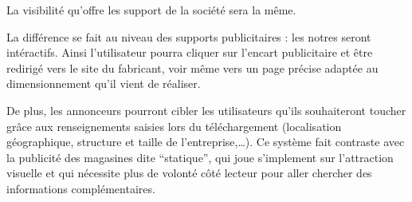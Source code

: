 	La visibilité qu'offre les support de la société \K{} sera la même.

	La différence se fait au niveau des supports publicitaires : les notres
	seront intéractifs. Ainsi l'utilisateur pourra cliquer sur l'encart publicitaire
	et être redirigé vers le site du fabricant, voir même vers un page précise
	adaptée au dimensionnement qu'il vient de réaliser.

	De plus, les annonceurs pourront cibler les utilisateurs qu'ils souhaiteront toucher
	grâce aux renseignements saisies lors du téléchargement (localisation géographique,
	structure et taille de l'entreprise,\ldots). Ce système fait contraste avec la
	publicité des magasines dite ``statique'', qui joue s'implement sur l'attraction
	visuelle et qui nécessite plus de volonté côté lecteur pour aller chercher des
	informations complémentaires.
	
